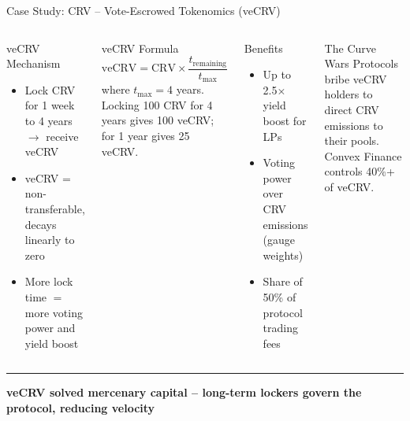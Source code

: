 \documentclass[8pt,aspectratio=169]{beamer}
\newcommand{\bottomnote}[1]{\vfill\vspace{-2mm}\textcolor{mllavender2}{\rule{\textwidth}{0.4pt}}\vspace{1mm}\footnotesize\textbf{#1}}
\begin{document}
\begin{frame}{Case Study: CRV -- Vote-Escrowed Tokenomics (veCRV)}
\begin{columns}[T]
\begin{block}{veCRV Mechanism}
\footnotesize
\begin{itemize}
  \item Lock CRV for 1 week to 4 years $\rightarrow$ receive veCRV
  \item veCRV = non-transferable, decays linearly to zero
  \item More lock time $=$ more voting power and yield boost
\end{itemize}
\end{block}
\vspace{1mm}
\begin{block}{veCRV Formula}
\footnotesize
\[
\text{veCRV} = \text{CRV} \times \frac{t_{\text{remaining}}}{t_{\max}}
\]
where $t_{\max} = 4$ years. Locking 100 CRV for 4 years gives 100 veCRV; for 1 year gives 25 veCRV.
\end{block}
\vspace{1mm}
\begin{exampleblock}{\footnotesize Benefits}
\footnotesize
\begin{itemize}
  \item Up to 2.5$\times$ yield boost for LPs
  \item Voting power over CRV emissions (gauge weights)
  \item Share of 50\% of protocol trading fees
\end{itemize}
\end{exampleblock}

\vspace{1mm}
\footnotesize
\begin{alertblock}{\footnotesize The Curve Wars}
\footnotesize
Protocols bribe veCRV holders to direct CRV emissions to their pools. Convex Finance controls 40\%+ of veCRV.
\end{alertblock}
\end{columns}
\bottomnote{veCRV solved mercenary capital -- long-term lockers govern the protocol, reducing velocity}
\end{frame}
\end{document}
